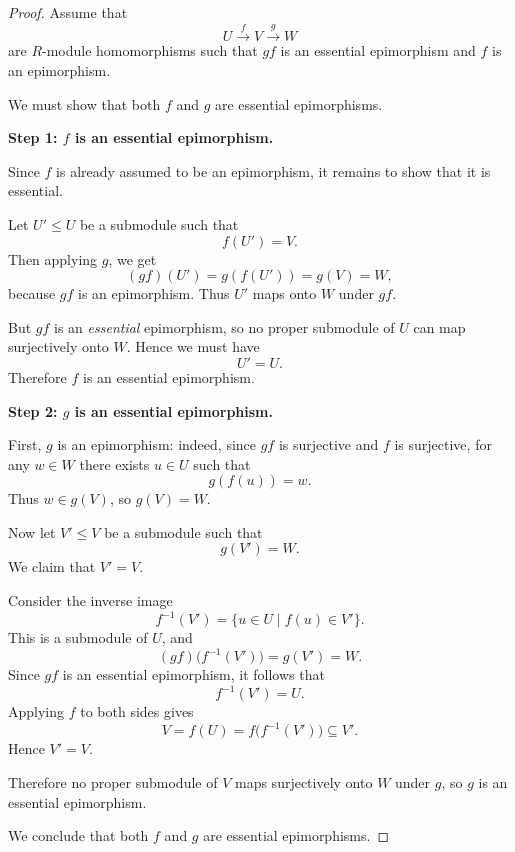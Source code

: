 \begin{proof}
    Assume that
    \[
        U \xrightarrow{f} V \xrightarrow{g} W
    \]
    are $R$-module homomorphisms such that $gf$ is an essential epimorphism and $f$ is an epimorphism.

    We must show that both $f$ and $g$ are essential epimorphisms.

    \medskip

    \noindent\textbf{Step 1: $f$ is an essential epimorphism.}

    Since $f$ is already assumed to be an epimorphism, it remains to show that it is essential.

    Let $U'\leq U$ be a submodule such that
    \[
        f(U')=V.
    \]
    Then applying $g$, we get
    \[
        (gf)(U')=g(f(U'))=g(V)=W,
    \]
    because $gf$ is an epimorphism. Thus $U'$ maps onto $W$ under $gf$.

    But $gf$ is an \emph{essential} epimorphism, so no proper submodule of $U$ can map
    surjectively onto $W$. Hence we must have
    \[
        U'=U.
    \]
    Therefore $f$ is an essential epimorphism.

    \medskip

    \noindent\textbf{Step 2: $g$ is an essential epimorphism.}

    First, $g$ is an epimorphism: indeed, since $gf$ is surjective and $f$ is surjective, for any
    $w\in W$ there exists $u\in U$ such that
    \[
        g(f(u))=w.
    \]
    Thus $w\in g(V)$, so $g(V)=W$.

    Now let $V'\leq V$ be a submodule such that
    \[
        g(V')=W.
    \]
    We claim that $V'=V$.

    Consider the inverse image
    \[
        f^{-1}(V')=\{u\in U\mid f(u)\in V'\}.
    \]
    This is a submodule of $U$, and
    \[
        (gf)\bigl(f^{-1}(V')\bigr)=g(V')=W.
    \]
    Since $gf$ is an essential epimorphism, it follows that
    \[
        f^{-1}(V')=U.
    \]
    Applying $f$ to both sides gives
    \[
        V=f(U)=f\bigl(f^{-1}(V')\bigr)\subseteq V'.
    \]
    Hence $V'=V$.

    Therefore no proper submodule of $V$ maps surjectively onto $W$ under $g$, so $g$ is an
    essential epimorphism.

    \medskip

    We conclude that both $f$ and $g$ are essential epimorphisms.
\end{proof}

